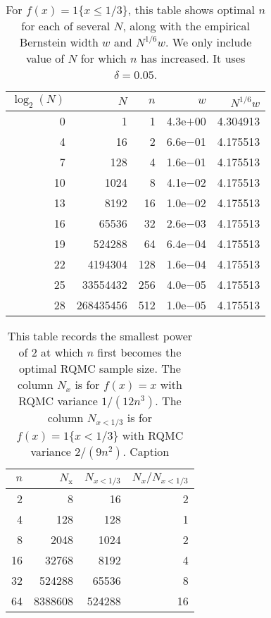 \documentclass{article}
\renewcommand{\le}{\leqslant}
\begin{document}
\begin{table}[t]
\centering
\begin{tabular}{rrrrr}
\toprule
$\log_2(N)$&         $N$ & $n$    &    $w$ &$N^{1/6}w$\\
\midrule 
  0&         1&   1& 4.3e$+$00 &4.304913\\
  4&        16&   2& 6.6e$-$01 &4.175513\\
  7&       128&   4& 1.6e$-$01 &4.175513\\
 10&      1024&   8& 4.1e$-$02 &4.175513\\
 13&      8192&  16& 1.0e$-$02 &4.175513\\
 16&     65536&  32& 2.6e$-$03 &4.175513\\
 19&   524288 & 64& 6.4e$-$04 &4.175513\\
 22&  4194304& 128& 1.6e$-$04 &4.175513\\
 25& 33554432& 256& 4.0e$-$05 &4.175513\\
 28& 268435456& 512& 1.0e$-$05 &4.175513\\
\bottomrule
\end{tabular}
\caption{\label{tab:forxunderonethird} For $f(x)=1\{x\le 1/3\}$, this table shows optimal
$n$ for each of several $N$, along with the empirical Bernstein
width $w$ and $N^{1/6}w$. We only include value of $N$ for which
$n$ has increased. It uses $\delta = 0.05$.
}
\end{table}


\begin{table}
    \centering
    \begin{tabular}{rrrr}
    \toprule
    $n$& $N_{\text{x}}$ & $N_{x<1/3}$ & $N_x/N_{x<1/3}$\\
\midrule
2&8& 16 & 2\\
4&128& 128 & 1\\
8&2048& 1024 & 2\\
16 &32768& 8192 & 4\\
32 &524288& 65536 & 8\\
64 &8388608& 524288 &16\\
\bottomrule
    \end{tabular}
    \caption{
This table records the smallest power of $2$
at which $n$ first becomes the optimal RQMC
sample size.  The column $N_x$ is for $f(x)=x$
with RQMC variance $1/(12n^3)$. The column $N_{x<1/3}$ is
for $f(x) = 1\{x<1/3\}$ with RQMC variance $2/(9n^2)$.
    Caption}
    \label{tab:my_label}
\end{table}



\end{document}
